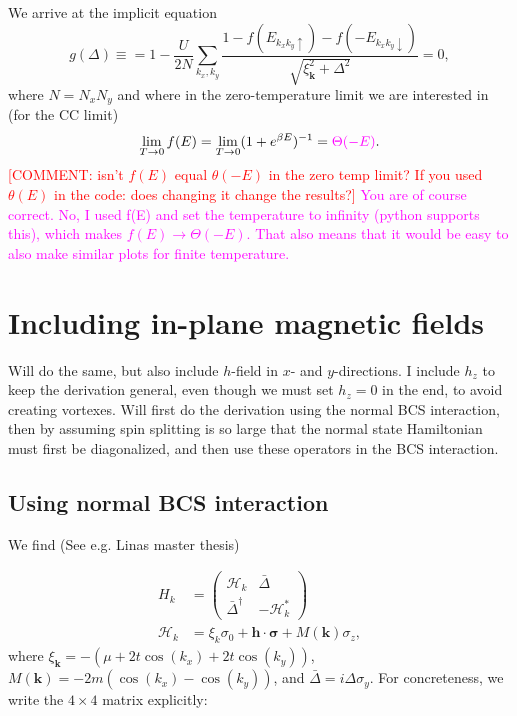 \documentclass[aps,onecolumn,amsmath,amssymb,preprintnumbers,floatfix,prl,superscriptaddress,longbibliography]{revtex4-2}%
\newcommand{\hans}[1]{\textcolor{Magenta}{{#1}}}
\newcommand{\jacob}[1]{\textcolor{Red}{{#1}}}
\renewcommand\vec{\mathbf}
\begin{document}
We arrive at the implicit equation
\begin{equation}
    g(\Delta) \equiv = 1 - \frac{U}{2 N} \sum_{k_x, k_y} \frac{1 - f(E_{k_x k_y \uparrow}) - f(-E_{k_x k_y \downarrow})}{\sqrt{\xi_\vec{k}^2 + \Delta^2}} = 0,
\end{equation}
where $N = N_x N_y$ and where in the zero-temperature limit we are interested in (for the CC limit)
\begin{equation}
    \lim_{T \rightarrow 0} f(E) = \lim_{T \rightarrow 0}  (1 + e^{\beta E})^{-1} = \hans{\Theta(-E)}.
\end{equation} 
\jacob{[COMMENT: isn't $f(E)$ equal $\theta(-E)$ in the zero temp limit? If you used $\theta(E)$ in the code: does changing it change the results?]}
\hans{You are of course correct. 
No, I used f(E) and set the temperature to infinity (python supports this), which makes $f(E)\rightarrow\Theta(-E)$. That also means that it would be easy to also make similar plots for finite temperature.}

\section{Including in-plane magnetic fields}
Will do the same, but also include $h$-field in $x$- and $y$-directions. I include $h_z$ to keep the derivation general, even though we must set $h_z = 0$ in the end, to avoid creating vortexes.
Will first do the derivation using the normal BCS interaction, then by assuming spin splitting is so large that the normal state Hamiltonian must first be diagonalized, and then use these operators in the BCS interaction.

\subsection{Using normal BCS interaction}
We find (See e.g. Linas master thesis)

\begin{align}
    H_k &= \begin{pmatrix}
        \mathcal H_k & \bar \Delta\\
        \bar \Delta^\dag & - \mathcal H_k^*
    \end{pmatrix}
    \\
    \mathcal H_k &= \xi_k \sigma_0 + \vec h \cdot \boldsymbol{\sigma} + M(\vec k) \sigma_z,
\end{align}
where $\xi_\vec{k} = - (\mu + 2t \cos(k_x) + 2t \cos(k_y) )$,  $M(\vec k) = - 2m (\cos(k_x) - \cos(k_y)) $, and $\bar \Delta = i \Delta \sigma_y$. For concreteness, we write the $4\times 4$ matrix explicitly:
\end{document}
